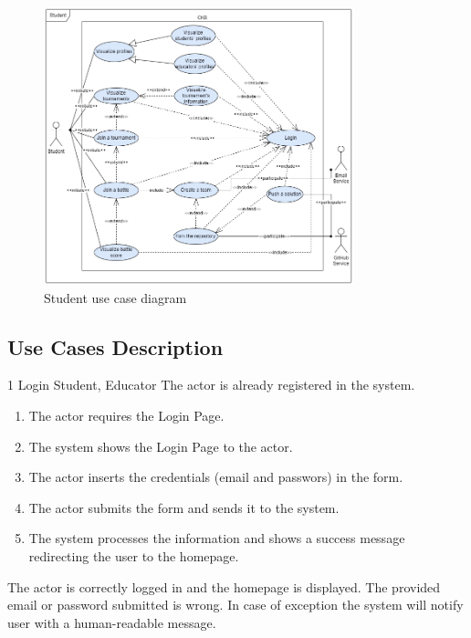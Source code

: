 \begin{figure}[H]
    \centering
    \includegraphics[width=0.8\textwidth]{images/use_cases_diagrams/students_functions.png}
    \caption{Student use case diagram}
\end{figure}
\clearpage

\subsection{Use Cases Description}
\usecase
{1}
{Login}
{Student, Educator}
{The actor is already registered in the system.}
{
    \begin{enumerate}
        \item The actor requires the Login Page.
        \item The system shows the Login Page to the actor.
        \item The actor inserts the credentials (email and passwors) in the form.
        \item The actor submits the form and sends it to the system.
        \item The system processes the information and shows a success message redirecting the user to the homepage.
    \end{enumerate}
}
{The actor is correctly logged in and the homepage is displayed.}
{
    The provided email or password submitted is wrong.
}
{
    In case of exception the system will notify user with a human-readable message.
}
\clearpage

